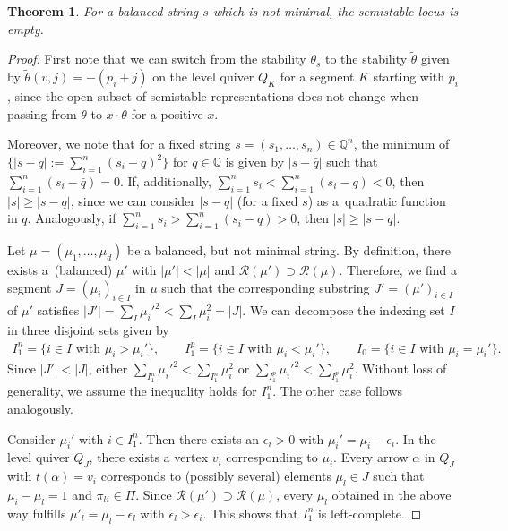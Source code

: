 \documentclass[10pt,a4paper]{amsart}
\newcommand{\R}{\mathcal{R}}
\numberwithin{equation}{section}
\newtheorem{Theorem}{Theorem}[section]
\theoremstyle{definition}
\begin{document}
\begin{Theorem} \label{theo balanced semi-stable empty}
For a balanced string $s$ which is not minimal, the semistable locus  is empty.
\end{Theorem}

\begin{proof}
First note that we can switch from the stability $\theta_s$ to the stability $\tilde{\theta}$ given by $\tilde{\theta}(v,j) = -(p_i +j)$ on the level quiver $Q_K$ for a segment $K$ starting with $p_i$, since the open subset of semistable representations does not change when passing from $\theta$ to $x \cdot \theta$ for a positive $x$.

Moreover, we note that for a fixed string $s = (s_1, \dots, s_n) \in \mathbb{Q}^n$, the minimum of $\big\{|s-q| := \sum_{i=1}^n (s_i - q)^2 \big\}$ for $q \in \mathbb{Q}$ is given by $|s-\bar{q}|$ such that $\sum_{i=1}^n (s_i-\bar{q}) =0$. If, additionally, $\sum_{i=1}^n s_i < \sum_{i=1}^n (s_i-q) <0$, then $|s| \geq |s-q|$, since we can consider $|s-q|$ (for a fixed $s$) as a~quadratic function in $q$. Analogously, if $\sum_{i=1}^n s_i > \sum_{i=1}^n (s_i-q) >0$, then $|s| \geq |s-q|$.

Let $\mu = (\mu_1, \dots, \mu_d)$ be a balanced, but not minimal string. By definition, there exists a~(balanced) $\mu'$ with $|\mu'| < |\mu|$ and $\R(\mu') \supset \R(\mu)$. Therefore, we find a segment $J= (\mu_i)_{i \in I}$ in $\mu$ such that the corresponding substring $J' = (\mu')_{i \in I}$ of $\mu'$ satisfies $|J'|= \sum_I \mu_i'^2 < \sum_I \mu_i^2=|J|$.
We can decompose the indexing set $I$ in three disjoint sets given by
\begin{align*}
I^n_1 = \{ i \in I \text{ with } \mu_i > \mu_i' \} ,\qquad
I^p_1 = \{ i \in I \text{ with } \mu_i <\mu_i' \}, \qquad
I_0 = \{ i \in I \text{ with } \mu_i = \mu_i' \} .
\end{align*}
Since $|J'| < |J|$, either $\sum_{I^n_1} \mu_i'^2 < \sum_{I^n_1} \mu_i^2$ or $\sum_{I^p_1} \mu_i'^2 < \sum_{I^p_1} \mu_i^2$. Without loss of generality, we assume the inequality holds for $I^n_1$. The other case follows analogously.

Consider $\mu_i'$ with $i \in I^n_1$. Then there exists an $\epsilon_i >0$ with $\mu_i' = \mu_i - \epsilon_i$. In the level quiver $Q_J$, there exists a vertex $v_i$ corresponding to $\mu_i$. Every arrow $\alpha$ in $Q_J$ with $t(\alpha)= v_i$ corresponds to (possibly several) elements $\mu_l \in J$ such that $\mu_i - \mu_l = 1$ and $\pi_{li} \in \Pi$. Since $\R(\mu') \supset \R(\mu)$, every $\mu_l$ obtained in the above way fulfills $\mu'_l = \mu_l - \epsilon_l$ with $\epsilon_l > \epsilon_i$. This shows that $I^n_1$ is left-complete.


\end{proof}
\end{document}
